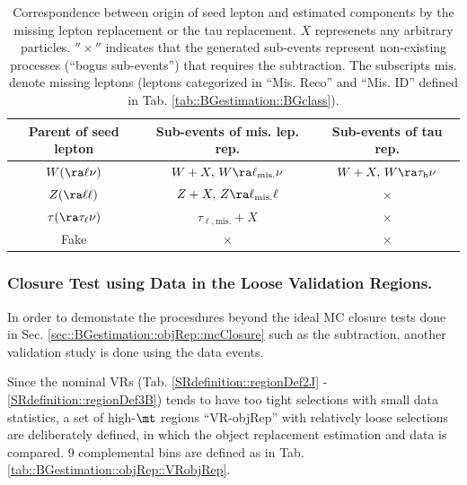\begin{table}[h]
  \begin{center}
    \caption{Correspondence between origin of seed lepton and estimated components by the missing lepton replacement or the tau replacement. $X$ represenets any arbitrary particles. $''\times''$ indicates that the generated sub-events represent non-existing processes (``bogus sub-events'') that requires the subtraction. The subscripts ${\mathrm{mis.}}$ denote missing leptons (leptons categorized in ``Mis. Reco'' and ``Mis. ID'' defined in Tab. \ref{tab::BGestimation::BGclass}).
}

    \begin{tabular}{  c | c | c  }
      \hline 
      Parent of seed lepton &   Sub-events of mis. lep. rep.  &  Sub-events of tau rep.  \\
%
      \hline 
      \hline      
      $W (\ra\ell\nu)$ &       $W+X, \, W\ra \ell_{\mathrm{mis.}}\nu$       &      $W+X, \, W\ra\tau_{\mathrm{h}} \nu$ \\
      \hline
      $Z (\ra\ell\ell)$ &       $Z+X, \, Z\ra \ell_{\mathrm{mis.}}\ell$     &      $\times$ \\
      \hline
      $\tau (\ra \tau_\ell \nu)$ &              $\tau_{\ell,{\mathrm{mis.}}}+X$             &      $\times$ \\
      \hline
      Fake &       $\times$       &      $\times$ \\
      \hline
    \end{tabular}  \label{tab::BGestimation::objRep::relProc}
  \end{center}
\end{table}




\clearpage
\subsubsection{Closure Test using Data in the Loose Validation Regions.} \label{sec::BGestimation::objRep::dataClosure}
In order to demonstate the procesdures beyond the ideal MC closure tests done in Sec. \ref{sec::BGestimation::objRep::mcClosure} such as the subtraction,
another validation study is done using the data events.

Since the nominal VRs (Tab. \ref{SRdefinition::regionDef2J} - \ref{SRdefinition::regionDef3B}) tends to have too tight selections with small data statistics, a set of high-$\mt$ regions ``VR-objRep'' with relatively loose selections are deliberately defined, in which the object replacement estimation and data is compared. 9 complemental bins are defined as in Tab. \ref{tab::BGestimation::objRep::VRobjRep}. \\

